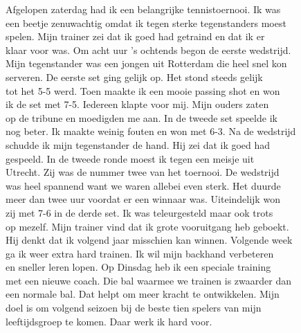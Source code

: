 \begin{opgave}

\begin{tekstmetfouten}
Afgelopen zaterdag had ik een belangrijke tennistoernooi. Ik was\\
een beetje zenuwachtig omdat ik tegen sterke tegenstanders moest\\
spelen. Mijn trainer zei dat ik goed had getraind en dat ik er\\
klaar voor was. Om acht uur 's ochtends begon de eerste wedstrijd.\\
Mijn tegenstander was een jongen uit Rotterdam die heel snel kon\\
serveren. De eerste set ging gelijk op. Het stond steeds gelijk\\
tot het 5-5 werd. Toen maakte ik een mooie passing shot en won\\
ik de set met 7-5. Iedereen klapte voor mij. Mijn ouders zaten\\
op de tribune en moedigden me aan. In de tweede set speelde ik\\
nog beter. Ik maakte weinig fouten en won met 6-3. Na de wedstrijd\\
schudde ik mijn tegenstander de hand. Hij zei dat ik goed had\\
gespeeld. In de tweede ronde moest ik tegen een meisje uit\\
Utrecht. Zij was de nummer twee van het toernooi. De wedstrijd\\
was heel spannend want we waren allebei even sterk. Het duurde\\
meer dan twee uur voordat er een winnaar was. Uiteindelijk won\\
zij met 7-6 in de derde set. Ik was teleurgesteld maar ook trots\\
op mezelf. Mijn trainer vind dat ik grote vooruitgang heb geboekt.\\
Hij denkt dat ik volgend jaar misschien kan winnen. Volgende week\\
ga ik weer extra hard trainen. Ik wil mijn backhand verbeteren\\
en sneller leren lopen. Op Dinsdag heb ik een speciale training\\
met een nieuwe coach. Die bal waarmee we trainen is zwaarder dan\\
een normale bal. Dat helpt om meer kracht te ontwikkelen. Mijn\\
doel is om volgend seizoen bij de beste tien spelers van mijn\\
leeftijdsgroep te komen. Daar werk ik hard voor.
\end{tekstmetfouten}


\end{opgave}
